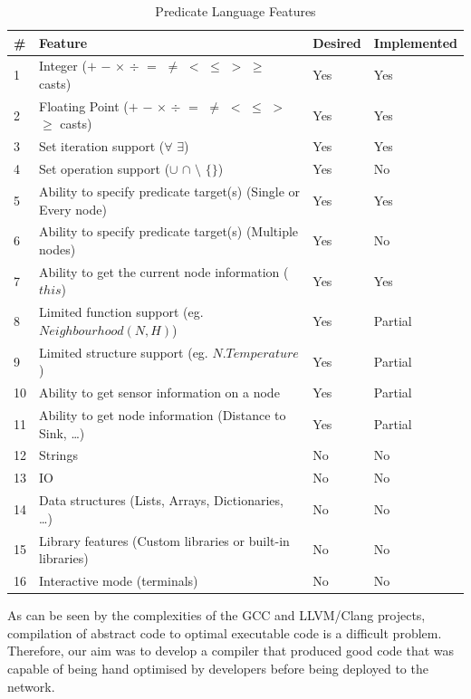 \begin{table}[H]
\centering
\begin{tabular}{| l | l | l | l |}
\hline
\# & Feature & Desired & Implemented \\
\hline
1 & Integer ($+$ $-$ $\times$ $\div$ $=$ $\neq$ $<$ $\leq$ $>$ $\geq$ casts) & Yes & Yes \\
2 & Floating Point ($+$ $-$ $\times$ $\div$ $=$ $\neq$ $<$ $\leq$ $>$ $\geq$ casts) & Yes & Yes \\

3 & Set iteration support ($\forall$ $\exists$) & Yes & Yes \\
4 & Set operation support ($\cup$ $\cap$ $\setminus$ $\{\}$) & Yes & No \\

5 & Ability to specify predicate target(s) (Single or Every node) & Yes & Yes \\
6 & Ability to specify predicate target(s) (Multiple nodes) & Yes & No \\

7 & Ability to get the current node information ($this$) & Yes & Yes \\

8 & Limited function support (eg. $Neighbourhood(N, H)$) & Yes & Partial \\
9 & Limited structure support (eg. $N.Temperature$) & Yes & Partial \\

10 & Ability to get sensor information on a node & Yes & Partial \\
11 & Ability to get node information (Distance to Sink, \ldots) & Yes & Partial \\

12 & Strings & No & No \\
13 & IO & No & No \\

14 & Data structures (Lists, Arrays, Dictionaries, \ldots) & No & No \\
15 & Library features (Custom libraries or built-in libraries) & No & No \\
16 & Interactive mode (terminals) & No & No \\
\hline
\end{tabular}
\label{tab:language-requirements}
\caption{Predicate Language Features}
\end{table}


As can be seen by the complexities of the GCC and LLVM/Clang projects, compilation of abstract code to optimal executable code is a difficult problem. Therefore, our aim was to develop a compiler that produced good code that was capable of being hand optimised by developers before being deployed to the network.

